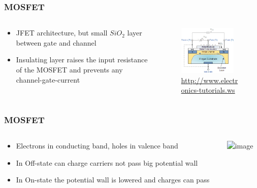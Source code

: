 \documentclass{beamer}
\begin{document}
\begin{frame}\frametitle{MOSFET} 
\begin{columns}
\begin{column}{6cm}
\begin{itemize}
\item<1-> JFET architecture, but small $SiO_2$ layer between gate and channel 

\item<2-> Insulating layer raises the input resistance of the MOSFET and prevents any channel-gate-current

\end{itemize}
\end{column}
\begin{column}{5cm}
\begin{figure}[H]
\centering
\includegraphics[width=0.9\textwidth]{mosfet}
\caption{\url{http://www.electronics-tutorials.ws}}%
\end{figure}
\end{column}
\end{columns}
\end{frame}

\begin{frame}\frametitle{MOSFET} 
\begin{columns}
\begin{column}{6cm}
\begin{itemize}
\item Electrons in conducting band, holes in valence band 
\item In Off-state can charge carriers not pass big potential wall
\item In On-state the potential wall is lowered and charges can pass
\end{itemize}
\end{column}
\begin{column}{5cm}
\includegraphics<1>[width=0.9\textwidth]{MOSFETvs}
\end{column}
\end{columns}
\end{frame}
\end{document}
